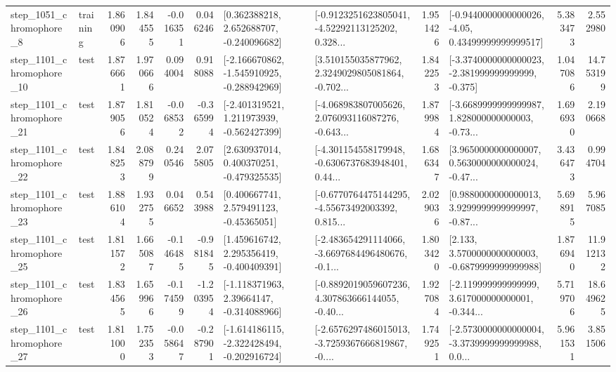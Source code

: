 \begin{tabular}{llrrrrllrlrr}
  step\_1051\_chromophore\_8 &  training &      1.860906 &    1.844555 &     -0.016351 &  0.046246 &    [0.362388218, 2.652688707, -0.240096682] &  [-0.9123251623805041, -4.52292113125202, 0.328... &       1.951426 &  [-0.9440000000000026, -4.05, 0.43499999999999517] &            5.383473 &          2.552980 \\
 step\_1101\_chromophore\_10 &      test &      1.876661 &    1.970666 &      0.094004 &  0.918088 &  [-2.166670862, -1.545910925, -0.288942969] &  [3.510155035877962, 2.3249029805081864, -0.702... &       1.842253 &  [-3.3740000000000023, -2.381999999999999, -0.375] &            1.047086 &         14.753199 \\
 step\_1101\_chromophore\_21 &      test &      1.879056 &    1.810524 &     -0.068532 & -0.365994 &   [-2.401319521, 1.211973939, -0.562427399] &  [-4.068983807005626, 2.076093116087276, -0.643... &       1.879984 &  [-3.6689999999999987, 1.828000000000003, -0.73... &            1.696930 &          2.190668 \\
 step\_1101\_chromophore\_22 &      test &      1.848253 &    2.088799 &      0.240546 &  2.075805 &    [2.630937014, 0.400370251, -0.479325535] &  [-4.301154558179948, -0.6306737683948401, 0.44... &       1.686347 &  [3.9650000000000007, 0.5630000000000024, -0.47... &            3.436473 &          0.994704 \\
 step\_1101\_chromophore\_23 &      test &      1.886104 &    1.932755 &      0.046652 &  0.543988 &     [0.400667741, 2.579491123, -0.45365051] &  [-0.6770764475144295, -4.55673492003392, 0.815... &       2.029036 &  [0.9880000000000013, 3.9299999999999997, -0.87... &            5.698915 &          5.967085 \\
 step\_1101\_chromophore\_25 &      test &      1.811572 &    1.665087 &     -0.146485 & -0.981845 &    [1.459616742, 2.295356419, -0.400409391] &  [-2.483654291114066, -3.6697684496480676, -0.1... &       1.803420 &   [2.133, 3.5700000000000003, -0.6879999999999988] &            1.876940 &         11.912132 \\
 step\_1101\_chromophore\_26 &      test &      1.834565 &    1.659966 &     -0.174599 & -1.203954 &    [-1.118371963, 2.39664147, -0.314088966] &  [-0.8892019059607236, 4.307863666144055, -0.40... &       1.927084 &  [-2.119999999999999, 3.617000000000001, -0.344... &            5.719706 &         18.649625 \\
 step\_1101\_chromophore\_27 &      test &      1.811000 &    1.752353 &     -0.058647 & -0.287901 &  [-1.614186115, -2.322428494, -0.202916724] &  [-2.6576297486015013, -3.7259367666819867, -0.... &       1.749251 &  [-2.5730000000000004, -3.3739999999999988, 0.0... &            5.961531 &          3.851506 \\

\end{tabular}
